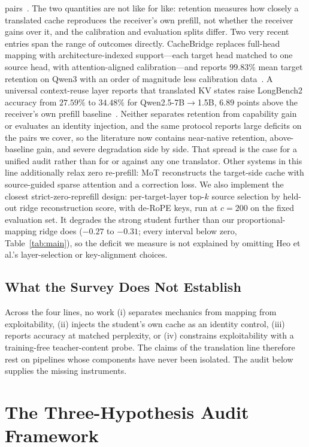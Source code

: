 \documentclass{article} %
\begin{document}
pairs~\citep{heo2026}. The two quantities are not like for like: retention
measures how closely a translated cache reproduces the receiver's own prefill,
not whether the receiver gains over it, and the calibration and evaluation
splits differ. Two very recent entries span the range of outcomes directly.
CacheBridge replaces full-head mapping with architecture-indexed support---each
target head matched to one source head, with attention-aligned calibration---and
reports $99.83\%$ mean target retention on Qwen3 with an order of magnitude
less calibration data~\citep{cachebridge2026}. A universal context-reuse layer
reports that translated KV states raise LongBench2 accuracy from $27.59\%$ to
$34.48\%$ for Qwen2.5-7B$\to$1.5B, $6.89$ points above the receiver's own
prefill baseline~\citep{contextreuse2026}. Neither separates retention from
capability gain or evaluates an identity injection, and the same protocol
reports large deficits on the pairs we cover, so the literature now contains
near-native retention, above-baseline gain, and severe degradation side by
side. That spread is the case for a unified audit rather than for or against
any one translator. Other systems in this line additionally relax zero re-prefill:
MoT reconstructs the target-side cache with source-guided sparse attention and
a correction loss. We also implement the closest strict-zero-reprefill design:
per-target-layer top-$k$ source selection by held-out ridge reconstruction
score, with de-RoPE keys, run at $c{=}200$ on the fixed evaluation set. It
degrades the strong student further than our proportional-mapping ridge does
($-0.27$ to $-0.31$; every interval below zero, Table~\ref{tab:main}), so the
deficit we measure is not explained by omitting Heo et al.'s layer-selection or
key-alignment choices.

\subsection{What the Survey Does Not Establish}
Across the four lines, no work (i) separates mechanics from mapping from
exploitability, (ii) injects the student's own cache as an identity control,
(iii) reports accuracy at matched perplexity, or (iv) constrains exploitability
with a training-free teacher-content probe. The claims of the translation line
therefore rest on pipelines whose components have never been isolated. The
audit below supplies the missing instruments.


\section{The Three-Hypothesis Audit Framework}
\label{sec:framework}
\end{document}
